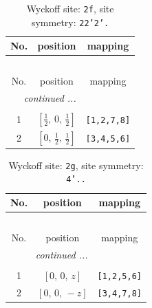 \documentclass[fleqn,8pt]{jsarticle}
\begin{document}
\renewcommand{\arraystretch}{1.2}
\begin{longtable}{ccc}
\caption{Wyckoff site: {\tt 2f}, site symmetry: {\tt 22'2'.}}
 \\
 \hline \hline
No. & position & mapping \\ \hline \endfirsthead

\multicolumn{2}{l}{\tablename\ \thetable{}} \\
 \hline \hline
No. & position & mapping \\ \hline \endhead

 \hline \hline
\multicolumn{2}{r}{\footnotesize\it continued ...} \\ \endfoot

 \hline \hline
\multicolumn{2}{r}{} \\ \endlastfoot

1 & $\left[ \frac{1}{2},\, 0,\, \frac{1}{2} \right]$ & {\tt [1,2,7,8]} \\ \hline
2 & $\left[ 0,\, \frac{1}{2},\, \frac{1}{2} \right]$ & {\tt [3,4,5,6]} \\
\end{longtable}
\renewcommand{\arraystretch}{1.2}
\begin{longtable}{ccc}
\caption{Wyckoff site: {\tt 2g}, site symmetry: {\tt 4'..}}
 \\
 \hline \hline
No. & position & mapping \\ \hline \endfirsthead

\multicolumn{2}{l}{\tablename\ \thetable{}} \\
 \hline \hline
No. & position & mapping \\ \hline \endhead

 \hline \hline
\multicolumn{2}{r}{\footnotesize\it continued ...} \\ \endfoot

 \hline \hline
\multicolumn{2}{r}{} \\ \endlastfoot

1 & $\left[ 0,\, 0,\, z \right]$ & {\tt [1,2,5,6]} \\ \hline
2 & $\left[ 0,\, 0,\, - z \right]$ & {\tt [3,4,7,8]} \\
\end{longtable}
\renewcommand{\arraystretch}{1.2}
\end{document}
